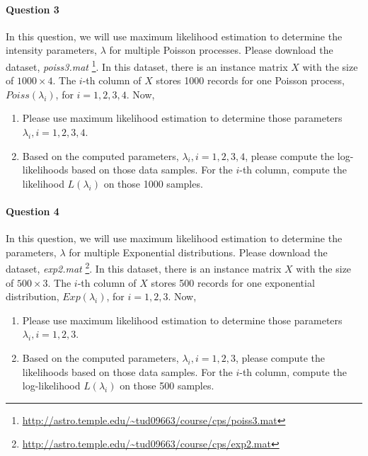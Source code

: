 \documentclass[11pt]{article} %
\begin{document}
\paragraph*{Question 3}
In this question, we will use maximum likelihood estimation to determine the intensity parameters, $\lambda$ for multiple Poisson processes. Please download the dataset, {\it poiss3.mat} \footnote{\url{http://astro.temple.edu/~tud09663/course/cps/poiss3.mat}}. In this dataset, there is an instance matrix $X$ with the size of $1000\times 4$. The $i$-th column of $X$ stores 1000 records for one Poisson process, $Poiss(\lambda_i)$, for $i=1,2,3,4$. Now, 
\begin{enumerate}
\item Please use maximum likelihood estimation to determine those parameters $\lambda_i, i=1, 2, 3, 4$.  
\item Based on the computed parameters, $\lambda_i, i=1, 2, 3, 4$, please compute the log-likelihoods based on those data samples. For the $i$-th column, compute the likelihood $L(\lambda_i)$ on those 1000 samples. 
\end{enumerate} 

\paragraph*{Question 4}
In this question, we will use maximum likelihood estimation to determine the parameters, $\lambda$ for multiple Exponential distributions. Please download the dataset, {\it exp2.mat} \footnote{\url{http://astro.temple.edu/~tud09663/course/cps/exp2.mat}}. In this dataset, there is an instance matrix $X$ with the size of $500\times 3$. The $i$-th column of $X$ stores 500 records for one exponential distribution, $Exp(\lambda_i)$, for $i=1,2,3$. Now, 
\begin{enumerate}
\item Please use maximum likelihood estimation to determine those parameters $\lambda_i, i=1, 2, 3$.  
\item Based on the computed parameters, $\lambda_i, i=1, 2, 3$, please compute the likelihoods based on those data samples. For the $i$-th column, compute the log-likelihood $L(\lambda_i)$ on those 500 samples. 
\end{enumerate} 
\end{document}
